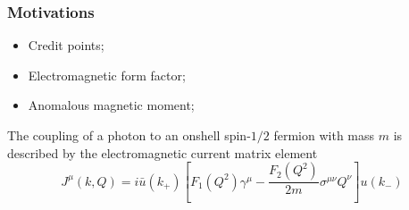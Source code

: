  \begin{frame}\frametitle{Motivations}


	
\begin{itemize}
	\item Credit points;
	\item Electromagnetic form factor;
	\item Anomalous magnetic moment; 
\end{itemize}
\vspace{2mm}



The coupling of a photon to an onshell spin-$1/2$ fermion with mass $m$ is described by the electromagnetic
current matrix element
\begin{equation}
	J^\mu(k, Q)=i\bar{u}(k_+)\left[F_1(Q^2)\gamma^\mu-\frac{F_2(Q^2)}{2m}\sigma^{\mu\nu}Q^\nu\right]u(k_-)
\end{equation}



\end{frame}

\endinput
